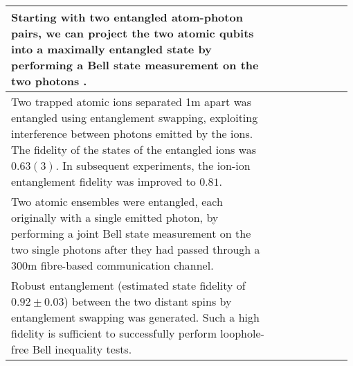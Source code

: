 \begin{table*}[!htbp]
\begin{tabular}{|p{0.755\linewidth}|p{0.22\linewidth}|}
		\hline
		Starting with two entangled atom-photon pairs, we can project the two atomic qubits into a maximally entangled state by performing a Bell state measurement on the two photons .&\cite{bib:blinov2004observation, bib:PRL_96_030404}\\
		\hline
		Two trapped atomic ions separated 1m apart was entangled using entanglement swapping, exploiting interference between photons emitted by the ions. The fidelity of the states of the entangled ions was $0.63(3)$. In subsequent experiments, the ion-ion entanglement fidelity was improved to $0.81$.&\cite{bib:Nature_449_68,bib:PRL_100_150404}\\
		\hline
		Two atomic ensembles were entangled, each originally with a single emitted photon, by performing a joint Bell state measurement on the two single photons after they had passed through a 300m fibre-based communication channel.&\cite{bib:Nature_454_1098}\\\hline
		Robust entanglement (estimated state fidelity of $0.92\pm0.03$) between the two distant spins by entanglement swapping was generated. Such a high fidelity is sufficient to successfully perform loophole-free Bell inequality tests.&\cite{bib:hensen2015loophole}\\\hline

\end{tabular}
\end{table*}
